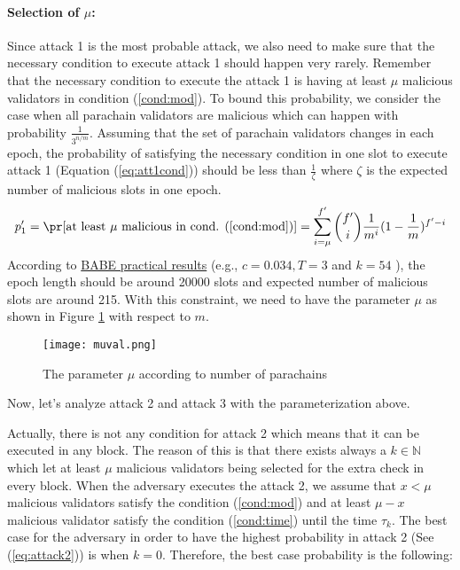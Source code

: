 \paragraph{Selection of $\mu$:} Since attack 1 is the most probable attack, we also need to make sure that the necessary condition to execute attack 1 should happen very rarely. Remember that the necessary condition to execute the attack 1 is having at least $\mu$ malicious validators in condition (\ref{cond:mod}).  To bound this probability, we consider the case when all parachain validators are malicious which can happen with probability $\frac{1}{3^{n/m}}$. Assuming that the set of parachain validators changes in each epoch, the probability of satisfying the necessary condition in one slot to execute attack 1 (Equation (\ref{eq:att1cond})) should be less than $\frac{1}{\zeta}$ where $\zeta$ is the expected number of malicious slots in one epoch. 
\begin{equation}\label{eq:att1cond}
    p'_1 = \pr[\text{at least }\mu \text{ malicious in cond. (\ref{cond:mod})}] = \sum_{i = \mu}^{f'}\binom{f'}{i}\frac{1}{m^i}(1-\frac{1}{m})^{f'-i}
\end{equation}
According to  \href{http://research.web3.foundation/en/latest/polkadot/BABE/Babe/#6-practical-results}{BABE practical results} (e.g., $c = 0.034, T = 3$ and $k = 54$ ), the epoch length should be around 20000 slots and expected number of malicious slots are around 215. With this constraint, we need to have the parameter $\mu$ as shown in Figure \ref{fig:muval} with respect to $m$.  

\begin{figure}[h]\centering
	  \texttt{[image: muval.png]}
	  \caption{The parameter $\mu$ according to number of parachains}
	  \label{fig:muval}
\end{figure}

Now, let's analyze attack 2 and attack 3 with the parameterization above.

Actually, there is not any condition for attack 2 which means that it can be executed in any block. The reason of this is that there exists always a $k \in \mathbb{N}$ which let at least $\mu$ malicious validators being selected for the extra check in every block. When the adversary executes the attack 2, we assume that $x < \mu$ malicious validators satisfy the condition (\ref{cond:mod}) and at least $\mu - x$ malicious validator satisfy the condition (\ref{cond:time}) until the time $\tau_k$. The best case for the adversary in order to have the highest probability in attack 2 (See (\ref{eq:attack2})) is when $k = 0$. Therefore, the best case probability is the following:

